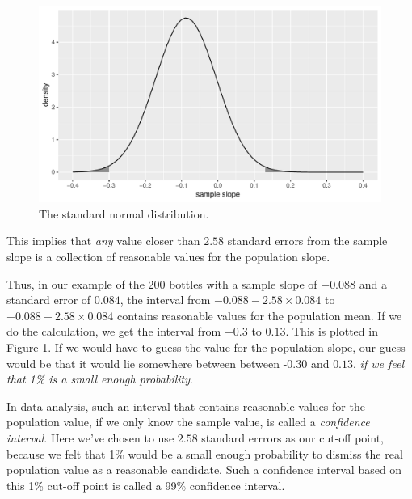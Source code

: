 \documentclass[]{book}\usepackage[]{graphicx}\usepackage[]{color}
\makeatletter
\def\maxwidth{ %
  \ifdim\Gin@nat@width>\linewidth
    \linewidth
  \else
    \Gin@nat@width
  \fi
}
\newenvironment{knitrout}{}{} %
\makeatother
\begin{document}
\begin{knitrout}
\color{fgcolor}\begin{figure}

{\centering \includegraphics[width=\maxwidth]{figure/normal_2z2-1} 

}

\caption[The standard normal distribution]{The standard normal distribution.}\label{fig:normal_2z2}
\end{figure}


\end{knitrout}

This implies that \textit{any} value closer than $2.58$ standard errors from the sample slope is a collection of reasonable values for the population slope.

Thus, in our example of the 200 bottles with a sample slope of $-0.088$ and a standard error of $0.084$, the interval from $-0.088- 2.58 \times 0.084$ to $-0.088+ 2.58 \times 0.084$ contains reasonable values for the population mean. If we do the calculation, we get the interval from $-0.3$ to $0.13$. This is plotted in Figure \ref{fig:normal_2z2}. If we would have to guess the value for the population slope, our guess would be that it would lie somewhere between between -0.30 and $0.13$, \textit{if we feel that 1\% is a small enough probability}.

In data analysis, such an interval that contains reasonable values for the population value, if we only know the sample value, is called a \textit{confidence interval}. Here we've chosen to use $2.58$ standard errrors as our cut-off point, because we felt that 1\% would be a small enough probability to dismiss the real population value as a reasonable candidate. Such a confidence interval based on this 1\% cut-off point is called a 99\% confidence interval.
\end{document}
